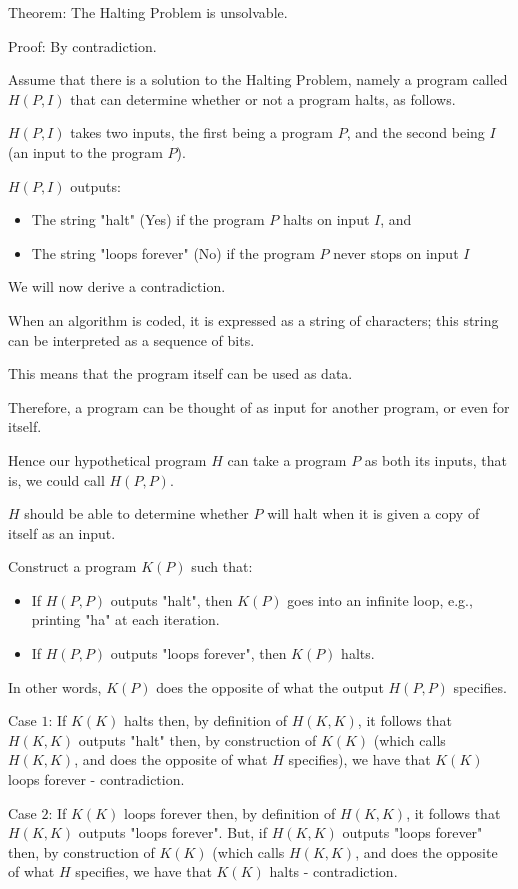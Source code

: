 \documentclass{article}
\begin{document}
Theorem: The Halting Problem is unsolvable.

Proof: By contradiction. 

Assume that there is a solution to the Halting Problem, namely a program called $H(P,I)$ that can determine whether or not a program halts, as follows.

$H(P,I)$ takes two inputs, the first being a program $P$, and the second being $I$ (an input to the program $P$).

$H(P,I)$ outputs:
\begin{itemize}
    \item The string "halt" (Yes) if the program $P$ halts on input $I$, and 
    \item The string "loops forever" (No) if the program $P$ never stops on input $I$
\end{itemize}

We will now derive a contradiction.

When an algorithm is coded, it is expressed as a string of characters; this string can be interpreted as a sequence of bits.

This means that the program itself can be used as data.

Therefore, a program can be thought of as input for another program, or even for itself.

Hence our hypothetical program $H$ can take a program $P$ as both its inputs, that is, we could call $H(P,P)$. 

$H$ should be able to determine whether $P$ will halt when it is given a copy of itself as an input.

Construct a program $K(P)$ such that:
\begin{itemize}
    \item If $H(P,P)$ outputs "halt", then $K(P)$ goes into an infinite loop, e.g., printing "ha" at each iteration.
    \item If $H(P,P)$ outputs "loops forever", then $K(P)$ halts.
\end{itemize}

In other words, $K(P)$ does the opposite of what the output $H(P,P)$ specifies.

Case $1$: If $K(K)$ halts then, by definition of $H(K,K)$, it follows that $H(K,K)$ outputs "halt" then, by construction of $K(K)$ (which calls $H(K,K)$, and does the opposite of what $H$ specifies), we have that $K(K)$ loops forever - contradiction.

Case $2$: If $K(K)$ loops forever then, by definition of $H(K,K)$, it follows that $H(K,K)$ outputs "loops forever". But, if $H(K,K)$ outputs "loops forever" then, by construction of $K(K)$ (which calls $H(K,K)$, and does the opposite of what $H$ specifies, we have that $K(K)$ halts - contradiction.
\end{document}

